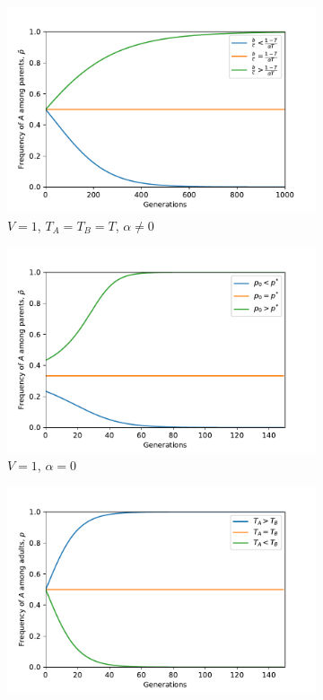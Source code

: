 \documentclass[12pt]{extarticle}
\begin{document}
\begin{figure}[H]
  \centering
  \begin{subfigure}{8cm}
    \includegraphics[scale=0.5]{figure2a.pdf}
    \caption{$V=1$, $T_A=T_B=T$, $\alpha \neq 0$}
    \label{fig:results_a}
  \end{subfigure}
  \begin{subfigure}{8cm}
    \includegraphics[scale=0.5]{figure2b.pdf}
    \caption{$V=1$, $\alpha = 0$}
    \label{fig:results_b}
  \end{subfigure}
  \begin{subfigure}{8cm}
    \includegraphics[scale=0.5]{figure2c.pdf}

\end{subfigure}
\end{figure}
\end{document}
